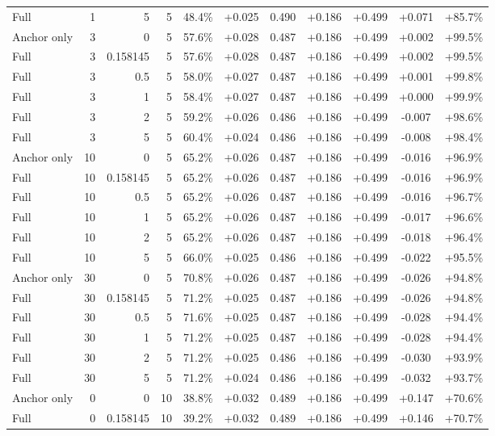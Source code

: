 \begin{table}[htbp]
\begin{tabular}{lrrrccccccc}
Full & 1 & 5 & 5 & 48.4\% & +0.025 & 0.490 & +0.186 & +0.499 & +0.071 & +85.7\% \\
Anchor only & 3 & 0 & 5 & 57.6\% & +0.028 & 0.487 & +0.186 & +0.499 & +0.002 & +99.5\% \\
Full & 3 & 0.158145 & 5 & 57.6\% & +0.028 & 0.487 & +0.186 & +0.499 & +0.002 & +99.5\% \\
Full & 3 & 0.5 & 5 & 58.0\% & +0.027 & 0.487 & +0.186 & +0.499 & +0.001 & +99.8\% \\
Full & 3 & 1 & 5 & 58.4\% & +0.027 & 0.487 & +0.186 & +0.499 & +0.000 & +99.9\% \\
Full & 3 & 2 & 5 & 59.2\% & +0.026 & 0.486 & +0.186 & +0.499 & -0.007 & +98.6\% \\
Full & 3 & 5 & 5 & 60.4\% & +0.024 & 0.486 & +0.186 & +0.499 & -0.008 & +98.4\% \\
Anchor only & 10 & 0 & 5 & 65.2\% & +0.026 & 0.487 & +0.186 & +0.499 & -0.016 & +96.9\% \\
Full & 10 & 0.158145 & 5 & 65.2\% & +0.026 & 0.487 & +0.186 & +0.499 & -0.016 & +96.9\% \\
Full & 10 & 0.5 & 5 & 65.2\% & +0.026 & 0.487 & +0.186 & +0.499 & -0.016 & +96.7\% \\
Full & 10 & 1 & 5 & 65.2\% & +0.026 & 0.487 & +0.186 & +0.499 & -0.017 & +96.6\% \\
Full & 10 & 2 & 5 & 65.2\% & +0.026 & 0.487 & +0.186 & +0.499 & -0.018 & +96.4\% \\
Full & 10 & 5 & 5 & 66.0\% & +0.025 & 0.486 & +0.186 & +0.499 & -0.022 & +95.5\% \\
Anchor only & 30 & 0 & 5 & 70.8\% & +0.026 & 0.487 & +0.186 & +0.499 & -0.026 & +94.8\% \\
Full & 30 & 0.158145 & 5 & 71.2\% & +0.025 & 0.487 & +0.186 & +0.499 & -0.026 & +94.8\% \\
Full & 30 & 0.5 & 5 & 71.6\% & +0.025 & 0.487 & +0.186 & +0.499 & -0.028 & +94.4\% \\
Full & 30 & 1 & 5 & 71.2\% & +0.025 & 0.487 & +0.186 & +0.499 & -0.028 & +94.4\% \\
Full & 30 & 2 & 5 & 71.2\% & +0.025 & 0.486 & +0.186 & +0.499 & -0.030 & +93.9\% \\
Full & 30 & 5 & 5 & 71.2\% & +0.024 & 0.486 & +0.186 & +0.499 & -0.032 & +93.7\% \\
Anchor only & 0 & 0 & 10 & 38.8\% & +0.032 & 0.489 & +0.186 & +0.499 & +0.147 & +70.6\% \\
Full & 0 & 0.158145 & 10 & 39.2\% & +0.032 & 0.489 & +0.186 & +0.499 & +0.146 & +70.7\% \\

\end{tabular}
\end{table}
